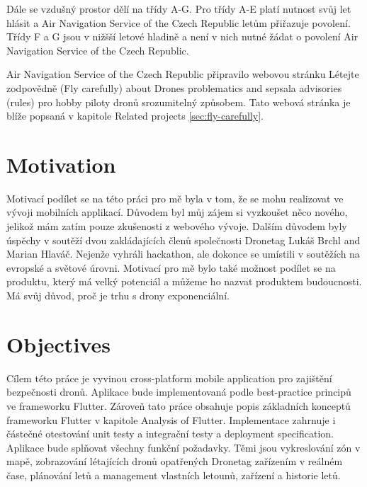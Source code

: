 Dále se vzdušný prostor dělí na třídy A-G.\cite{airspace}
Pro třídy A-E platí nutnost svůj let hlásit a Air Navigation Service of the Czech Republic letům přiřazuje povolení.
Třídy F a G jsou v nižšší letové hladině a není v nich nutné žádat o povolení Air Navigation Service of the Czech Republic.

Air Navigation Service of the Czech Republic připravilo webovou stránku L{\' e}tejte zodpov{\v e}dn{\v e} (Fly carefully) about Drones problematics and sepsala advisories (rules) pro hobby piloty dronů srozumitelný způsobem.
Tato webová stránka je blíže popsaná v kapitole Related projects \ref{sec:fly-carefully}.


\section{Motivation}\label{sec:motivation}
Motivací podílet se na této práci pro mě byla v tom, že se mohu realizovat ve vývoji mobilních applikací.
Důvodem byl můj zájem si vyzkoušet něco nového, jelikož mám zatím pouze zkušenosti z webového vývoje.
Dalším důvodem byly úspěchy v soutěží dvou zakládajících členů společnosti Dronetag Luk{\' a}{\v s} Brchl and Marian Hlav{\' a}{\v c}.
Nejenže vyhráli hackathon, ale dokonce se umístili v soutěžích na evropské a světové úrovni.
Motivací pro mě bylo také možnost podílet se na produktu, který má velký potenciál a můžeme ho nazvat produktem budoucnosti.
Má svůj důvod, proč je trhu s drony exponenciální.


\section{Objectives}\label{sec:objectives}
Cílem této práce je vyvinou cross-platform mobile application pro zajištění bezpečnosti dronů.
Aplikace bude implementovaná podle best-practice principů ve frameworku Flutter.
Zároveň tato práce obsahuje popis základních konceptů frameworku Flutter v kapitole Analysis of Flutter.
Implementace zahrnuje i částečné otestování unit testy a integrační testy a deployment specification.
Aplikace bude splňovat všechny funkční požadavky.
Těmi jsou vykreslování zón v mapě, zobrazování létajících dronů opatřených Dronetag zařízením v reálném čase, plánování letů a management vlastních letounů, zařízení a historie letů.
